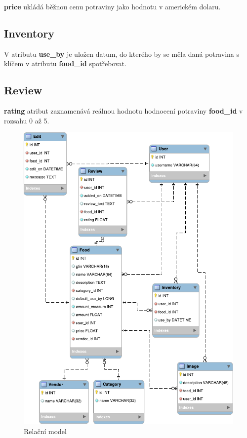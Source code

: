 \documentclass[thesis=B,czech]{FITthesis}[2013/10/20]
\begin{document}
\textbf{price} ukládá běžnou cenu potraviny jako hodnotu v americkém dolaru.

\subsection{Inventory}
V atributu \textbf{use\_by} je uložen datum, do kterého by se měla daná potravina s klíčem v atributu \textbf{food\_id} spotřebovat.

\subsection{Review}
\textbf{rating} atribut zaznamenává reálnou hodnotu hodnocení potraviny \textbf{food\_id} v rozsahu 0 až 5.


\begin{figure}[H]
  \centering
  \includegraphics[scale=1.20]{diagrams/relational_model}
  \caption{Relační model}
  \label{fig:RelationalModel}
\end{figure}
\end{document}
